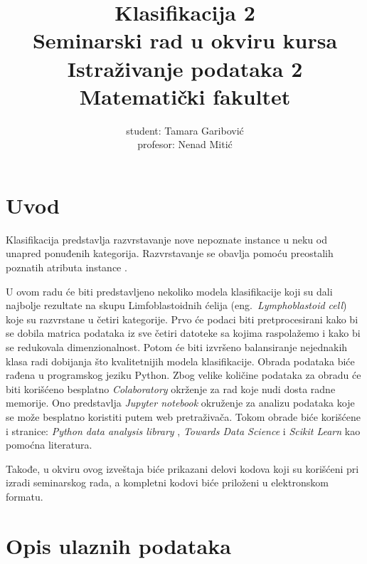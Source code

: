 \documentclass[a4paper]{article}
\begin{document}
\title{Klasifikacija 2\\ \small{Seminarski rad u okviru kursa\\Istraživanje podataka 2\\ Matematički fakultet}}

\author{student: Tamara Garibović\\ profesor: Nenad Mitić}


\maketitle


\tableofcontents

\newpage

\section{Uvod}
\label{sec:uvod}

Klasifikacija predstavlja razvrstavanje nove nepoznate instance u neku od unapred ponuđenih kategorija. Razvrstavanje se obavlja pomoću preostalih poznatih atributa instance \cite{vi}.

U ovom radu će biti predstavljeno nekoliko modela klasifikacije koji su dali najbolje rezultate na skupu Limfoblastoidnih ćelija (eng.~{\em Lymphoblastoid cell}) koje su razvrstane u četiri kategorije. Prvo će podaci biti pretprocesirani kako bi se dobila matrica podataka iz sve četiri datoteke sa kojima raspolažemo i kako bi se redukovala dimenzionalnost. Potom će biti izvršeno balansiranje nejednakih klasa radi dobijanja što kvalitetnijih modela klasifikacije. Obrada podataka biće rađena u programskog jeziku Python. Zbog velike količine podataka za obradu će biti korišćeno besplatno {\em Colaboratory} \cite{colab} okrženje za rad koje nudi dosta radne memorije. Ono predstavlja {\em Jupyter notebook} okruženje za analizu podataka koje se može besplatno koristiti putem web pretraživača. Tokom obrade biće korišćene i stranice: {\em Python data analysis library} \cite{panda}, {\em Towards Data Science} \cite{tds} i {\em Scikit Learn} \cite{scikit} kao pomoćna literatura.

Takođe, u okviru ovog izveštaja biće prikazani delovi kodova koji su korišćeni pri izradi seminarskog rada, a kompletni kodovi biće priloženi u elektronskom formatu.

\section{Opis ulaznih podataka}
\label{sec:opis}
\end{document}

